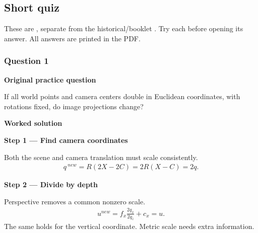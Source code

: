 \documentclass[letterpaper,11pt,english,openany,oneside]{jupyterBook}
\begin{document}
\subsection{Short quiz}
\label{\detokenize{lectures/lecture06/tldr:short-quiz}}
\sphinxAtStartPar
These are , separate from the historical/booklet {\hyperref[\detokenize{lectures/lecture06/quiz-workbook::doc}]{}}. Try each before opening its answer. All answers are printed in the PDF.


\subsubsection{Question 1}
\label{\detokenize{lectures/lecture06/tldr:question-1}}
\par\medskip\textbf{Original practice question}\par\smallskip

\sphinxAtStartPar
If all world points and camera centers double in Euclidean coordinates, with rotations fixed, do image projections change?

\par\medskip

\par\medskip
\textbf{Worked solution}\par\smallskip

\par\medskip{}
{\color{QuizStepRed}\bfseries Step 1 — Find camera coordinates}\par\smallskip

\sphinxAtStartPar
{} Both the scene and camera translation must scale consistently.
{\color{QuizMathBlue} \begin{equation*}
\begin{split}q\,{}^{new}=R(2X-2C)=2R(X-C)=2q.\end{split}
\end{equation*}}
\par

\par\medskip{}
{\color{QuizStepRed}\bfseries Step 2 — Divide by depth}\par\smallskip

\sphinxAtStartPar
{} Perspective removes a common nonzero scale.
{\color{QuizMathBlue} \begin{equation*}
\begin{split}u^{new}=f_x\frac{2q_x}{2q_z}+c_x=u.\end{split}
\end{equation*}}
\sphinxAtStartPar
The same holds for the vertical coordinate. Metric scale needs extra information.
\end{document}
